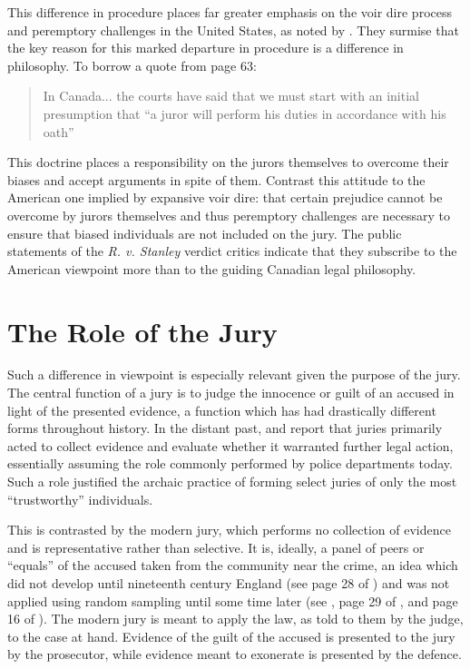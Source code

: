 This difference in procedure places far greater emphasis on the voir dire process and peremptory challenges in the United
States, as noted by \cite{hansvidjudging}. They surmise that the key reason for this marked departure in procedure is a difference
in philosophy. To borrow a quote from page 63:

\begin{quote}
  In Canada... the courts have said that we must start with an initial presumption that ``a juror will perform his
  duties in accordance with his oath''
\end{quote}

This doctrine places a responsibility on the jurors themselves to overcome their biases and accept arguments in spite of
them. Contrast this attitude to the American one implied by expansive voir dire: that certain prejudice cannot be
overcome by jurors themselves and thus peremptory challenges are necessary to ensure that biased individuals are not included on
the jury. The public statements of the \textit{R. v. Stanley} verdict
critics indicate that they subscribe to the American viewpoint more
than to the guiding Canadian legal philosophy. 

\section{The Role of the Jury} \label{sec:rolejur}

Such a difference in viewpoint is especially relevant given the purpose of the jury. The central function of a jury is to judge
the innocence or guilt of an accused in light of the presented evidence, a function which has had drastically different forms
throughout history. In the distant past, \cite{vonmosch1921} and \cite{hoffman1997} report that juries primarily acted to collect
evidence and evaluate whether it warranted further legal action, essentially assuming the role commonly performed by police
departments today. Such a role justified the archaic practice of forming select juries of only the most ``trustworthy'' individuals.

This is contrasted by the modern jury, which performs no collection of evidence and is representative rather than
selective. It is, ideally, a panel of peers or ``equals'' of the accused taken from the community near the crime, an idea which
did not develop until nineteenth century England (see page 28 of \cite{hansvidjudging}) and was not applied using random sampling until
some time later (see \cite{hoffman1997}, page 29 of \cite{hansvidjudging}, and page 16 of \cite{vandykejurysel}). The modern jury
is meant to apply the law, as told to them by the judge\footnotemark, to the case at hand. Evidence of the guilt of the accused is
presented to the jury by the prosecutor, while evidence meant to exonerate is presented by the defence.

